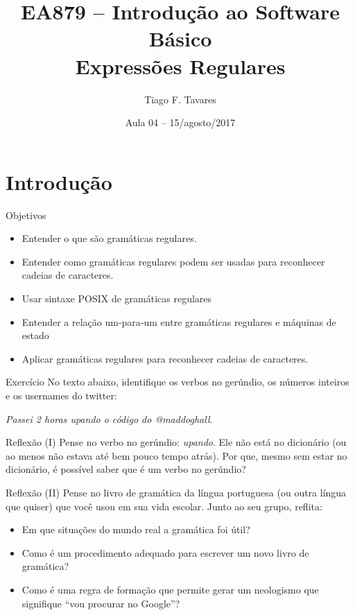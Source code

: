 \documentclass{beamer}
\title[04-Expressões Regulares]{EA879 -- Introdução ao Software Básico\\Expressões Regulares}
\author{Tiago F. Tavares}
\institute{FEEC -- UNICAMP}
\date{Aula 04 -- 15/agosto/2017}
\begin{document}
\begin{frame}
  \titlepage
\end{frame}


\section{Introdução}

\begin{frame}{Objetivos}
  \Large
  \begin{itemize}
  \item Entender o que são gramáticas regulares.
  \item Entender como gramáticas regulares podem ser usadas para reconhecer
    cadeias de caracteres.
  \item Usar sintaxe POSIX de gramáticas regulares
  \item Entender a relação um-para-um entre gramáticas regulares e máquinas de
  estado
  \item Aplicar gramáticas regulares para reconhecer cadeias de caracteres.
  \end{itemize}
\end{frame}

\begin{frame}{Exercício}
  \centering
  No texto abaixo, identifique os verbos no gerúndio, os números inteiros e os
  usernames do twitter:

  \vspace{0.5in}

  \textit{Passei 2 horas upando o código do @maddoghall}.
\end{frame}

\begin{frame}{Reflexão (I)}
  \centering
  \Large
  Pense no verbo no gerúndio: \textit{upando}. Ele não está no dicionário (ou ao
  menos não estava até bem pouco tempo atrás). Por que, mesmo sem estar no
  dicionário, é possível saber que é um verbo no gerúndio?
\end{frame}

\begin{frame}{Reflexão (II)}
  \centering
  \Large
  Pense no livro de gramática da língua portuguesa (ou outra língua que quiser)
  que você usou em sua vida escolar. Junto ao seu grupo, reflita:
  \begin{itemize}
    \item Em que situações do mundo real a gramática foi útil?
    \item Como é um procedimento adequado para escrever um novo livro de
      gramática?
    \item<2-> Como é uma regra de formação que permite gerar um neologismo que
      signifique ``vou procurar no Google''?
  \end{itemize}
\end{frame}
\end{document}
